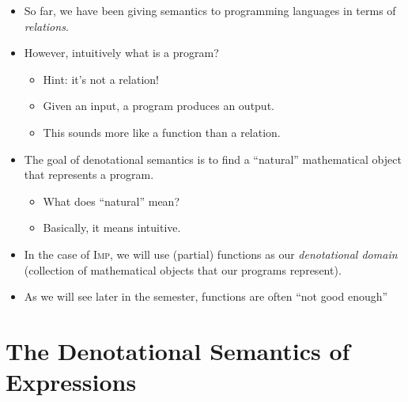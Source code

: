\documentclass{lecturenotes}
\newcommand{\Imp}{\textsc{Imp}\xspace}
\begin{document}
\begin{itemize}
\item So far, we have been giving semantics to programming languages in terms of \emph{relations}.
\item However, intuitively what is a program?
  \begin{itemize}
  \item Hint: it's not a relation!
  \item Given an input, a program produces an output.
  \item This sounds more like a function than a relation.
  \end{itemize}
\item The goal of denotational semantics is to find a ``natural'' mathematical object that represents a program.
  \begin{itemize}
  \item What does ``natural'' mean?
  \item Basically, it means intuitive.
  \end{itemize}
\item In the case of \Imp, we will use (partial) functions as our \emph{denotational domain} (collection of mathematical objects that our programs represent).
\item As we will see later in the semester, functions are often ``not good enough''
\end{itemize}

\section{The Denotational Semantics of Expressions}
\label{sec:denot-semant-arithm}
\end{document}
